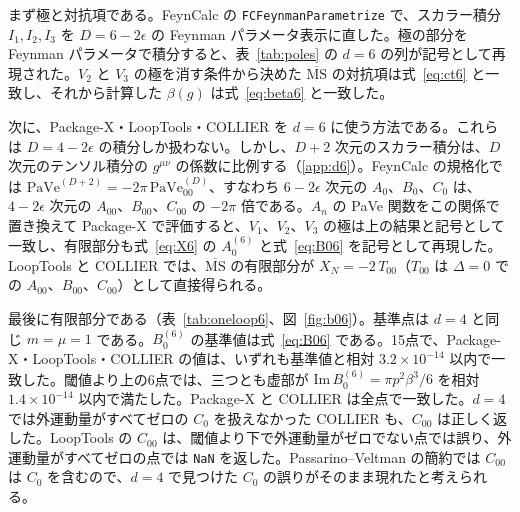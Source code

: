 \documentclass[a4paper,10pt]{ltjsarticle}
\begin{document}
まず極と対抗項である。FeynCalc の \texttt{FCFeynmanParametrize} で、スカラー積分 $I_1,I_2,I_3$ を $D=6-2\epsilon$ の Feynman パラメータ表示に直した。極の部分を Feynman パラメータで積分すると、表~\ref{tab:poles} の $d=6$ の列が記号として再現された。$V_2$ と $V_3$ の極を消す条件から決めた $\overline{\mathrm{MS}}$ の対抗項は式~\eqref{eq:ct6} と一致し、それから計算した $\beta(g)$ は式~\eqref{eq:beta6} と一致した。

次に、Package-X・LoopTools・COLLIER を $d=6$ に使う方法である。これらは $D=4-2\epsilon$ の積分しか扱わない。しかし、$D+2$ 次元のスカラー積分は、$D$ 次元のテンソル積分の $g^{\mu\nu}$ の係数に比例する（\ref{app:d6}）。FeynCalc の規格化では $\mathrm{PaVe}^{(D+2)}=-2\pi\,\mathrm{PaVe}_{00}^{(D)}$、すなわち $6-2\epsilon$ 次元の $A_0$、$B_0$、$C_0$ は、$4-2\epsilon$ 次元の $A_{00}$、$B_{00}$、$C_{00}$ の $-2\pi$ 倍である。$A_n$ の PaVe 関数をこの関係で置き換えて Package-X で評価すると、$V_1$、$V_2$、$V_3$ の極は上の結果と記号として一致し、有限部分も式~\eqref{eq:X6} の $A_0^{(6)}$ と式~\eqref{eq:B06} を記号として再現した。LoopTools と COLLIER では、$\overline{\mathrm{MS}}$ の有限部分が $X_N=-2\,T_{00}$（$T_{00}$ は $\Delta=0$ での $A_{00}$、$B_{00}$、$C_{00}$）として直接得られる。

最後に有限部分である（表~\ref{tab:oneloop6}、図~\ref{fig:b06}）。基準点は $d=4$ と同じ $m=\mu=1$ である。$B_0^{(6)}$ の基準値は式~\eqref{eq:B06} である。15点で、Package-X・LoopTools・COLLIER の値は、いずれも基準値と相対 $3.2\times10^{-14}$ 以内で一致した。閾値より上の6点では、三つとも虚部が $\mathrm{Im}\,B_0^{(6)}=\pi p^2\beta^3/6$ を相対 $1.4\times10^{-14}$ 以内で満たした。Package-X と COLLIER は全点で一致した。$d=4$ では外運動量がすべてゼロの $C_0$ を扱えなかった COLLIER も、$C_{00}$ は正しく返した。LoopTools の $C_{00}$ は、閾値より下で外運動量がゼロでない点では誤り、外運動量がすべてゼロの点では \texttt{NaN} を返した。Passarino--Veltman の簡約では $C_{00}$ は $C_0$ を含むので、$d=4$ で見つけた $C_0$ の誤りがそのまま現れたと考えられる。
\end{document}
